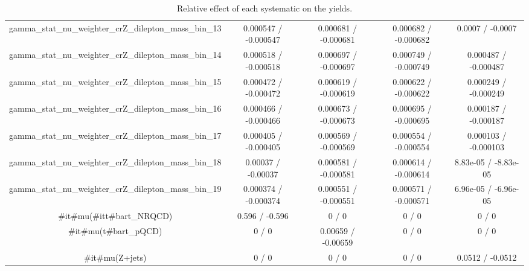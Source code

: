 \documentclass[10pt]{article}
\begin{document}
\begin{table}[htbp]
\begin{center}
\begin{tabular}{|c|c|c|c|c|}
  gamma_stat_nu_weighter_crZ_dilepton_mass_bin_13 & 0.000547 / -0.000547 & 0.000681 / -0.000681 & 0.000682 / -0.000682 & 0.0007 / -0.0007 \\ 
  gamma_stat_nu_weighter_crZ_dilepton_mass_bin_14 & 0.000518 / -0.000518 & 0.000697 / -0.000697 & 0.000749 / -0.000749 & 0.000487 / -0.000487 \\ 
  gamma_stat_nu_weighter_crZ_dilepton_mass_bin_15 & 0.000472 / -0.000472 & 0.000619 / -0.000619 & 0.000622 / -0.000622 & 0.000249 / -0.000249 \\ 
  gamma_stat_nu_weighter_crZ_dilepton_mass_bin_16 & 0.000466 / -0.000466 & 0.000673 / -0.000673 & 0.000695 / -0.000695 & 0.000187 / -0.000187 \\ 
  gamma_stat_nu_weighter_crZ_dilepton_mass_bin_17 & 0.000405 / -0.000405 & 0.000569 / -0.000569 & 0.000554 / -0.000554 & 0.000103 / -0.000103 \\ 
  gamma_stat_nu_weighter_crZ_dilepton_mass_bin_18 & 0.00037 / -0.00037 & 0.000581 / -0.000581 & 0.000614 / -0.000614 & 8.83e-05 / -8.83e-05 \\ 
  gamma_stat_nu_weighter_crZ_dilepton_mass_bin_19 & 0.000374 / -0.000374 & 0.000551 / -0.000551 & 0.000571 / -0.000571 & 6.96e-05 / -6.96e-05 \\ 
  #it{#mu}(#it{t#bar{t}}_{NRQCD}) & 0.596 / -0.596 & 0 / 0 & 0 / 0 & 0 / 0 \\ 
  #it{#mu}(t#bar{t}_{pQCD}) & 0 / 0 & 0.00659 / -0.00659 & 0 / 0 & 0 / 0 \\ 
  #it{#mu}(Z+jets) & 0 / 0 & 0 / 0 & 0 / 0 & 0.0512 / -0.0512 \\ 
\hline 
\end{tabular} 
\caption{Relative effect of each systematic on the yields.} 
\end{center} 
\end{table} 
\end{document}
